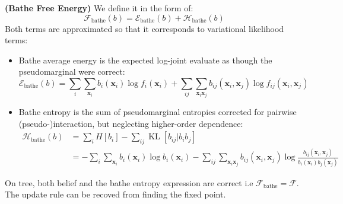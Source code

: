 \begin{definition}{\textbf{(Bathe Free Energy)}}
    We define it in the form of:
    \begin{equation*}
        \mathcal{F}_\text{bathe}(b) = \mathcal{E}_\text{bathe}(b) + \mathcal{H}_\text{bathe}(b) 
    \end{equation*}
    Both terms are approximated so that it corresponds to variational likelihood terms:
    \begin{itemize}
        \item Bathe average energy is the expected log-joint evaluate as though the pseudomarginal were correct:
        \begin{equation*}
            \mathcal{E}_\text{bathe}(b) = \sum_i\sum_{\boldsymbol x_i} b_i(\boldsymbol x_i)\log f_i(\boldsymbol x_i) + \sum_{ij}\sum_{\boldsymbol x_i\boldsymbol x_j} b_{ij}(\boldsymbol x_i, \boldsymbol x_j)\log f_{ij}(\boldsymbol x_i, \boldsymbol x_j)
        \end{equation*}
        \item Bathe entropy is the sum of pseudomarginal entropies corrected for pairwise (pseudo-)interaction, but neglecting higher-order dependence:
        \begin{equation*}
        \begin{aligned}
            \mathcal{H}_\text{bathe}(b) &= \sum_i H[b_i] - \sum_{ij}\operatorname{KL}[b_{ij} | b_ib_j] \\
            &= -\sum_i\sum_{\boldsymbol x_i} b_i(\boldsymbol x_i)\log b_i(\boldsymbol x_i) - \sum_{ij}\sum_{\boldsymbol x_i\boldsymbol x_j}b_{ij}(\boldsymbol x_i, \boldsymbol x_j)\log \frac{b_{ij}(\boldsymbol x_i, \boldsymbol x_j)}{b_i(\boldsymbol x_i)b_j(\boldsymbol x_j)}
        \end{aligned}
        \end{equation*}
    \end{itemize}
    On tree, both belief and the bathe entropy expression are correct i.e $\mathcal{F}_\text{bathe} = \mathcal{F}$. The update rule can be recoved from finding the fixed point. 
\end{definition}

